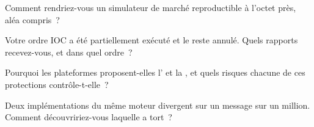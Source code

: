 \begin{interviewq}\label{iq:mx:build-a-matching-engine-and-exchange-simulator:3}
Comment rendriez-vous un simulateur de marché reproductible à l'octet près, aléa compris~?
\end{interviewq}

\begin{interviewq}\label{iq:mx:build-a-matching-engine-and-exchange-simulator:4}
Votre ordre IOC a été partiellement exécuté et le reste annulé. Quels rapports recevez-vous, et dans quel ordre~?
\end{interviewq}

\begin{interviewq}\label{iq:mx:build-a-matching-engine-and-exchange-simulator:5}
Pourquoi les plateformes proposent-elles l' et la , et quels risques chacune de ces protections contrôle-t-elle~?
\end{interviewq}

\begin{interviewq}\label{iq:mx:build-a-matching-engine-and-exchange-simulator:6}
Deux implémentations du même moteur divergent sur un message sur un million. Comment découvririez-vous laquelle a tort~?
\end{interviewq}
